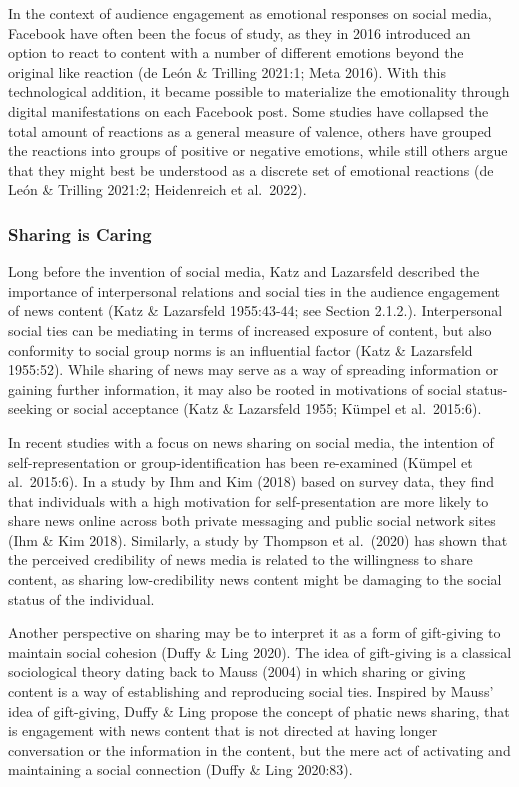 \documentclass[
]{article}
\begin{document}
In the context of audience engagement as emotional responses on social
media, Facebook have often been the focus of study, as they in 2016
introduced an option to react to content with a number of different
emotions beyond the original like reaction (de León \& Trilling 2021:1;
Meta 2016). With this technological addition, it became possible to
materialize the emotionality through digital manifestations on each
Facebook post. Some studies have collapsed the total amount of reactions
as a general measure of valence, others have grouped the reactions into
groups of positive or negative emotions, while still others argue that
they might best be understood as a discrete set of emotional reactions
(de León \& Trilling 2021:2; Heidenreich et al.~2022).

\hypertarget{sharing-is-caring}{%
\subsubsection{Sharing is Caring}\label{sharing-is-caring}}

\noindent Long before the invention of social media, Katz and Lazarsfeld
described the importance of interpersonal relations and social ties in
the audience engagement of news content (Katz \& Lazarsfeld 1955:43-44;
see Section 2.1.2.). Interpersonal social ties can be mediating in terms
of increased exposure of content, but also conformity to social group
norms is an influential factor (Katz \& Lazarsfeld 1955:52). While
sharing of news may serve as a way of spreading information or gaining
further information, it may also be rooted in motivations of social
status-seeking or social acceptance (Katz \& Lazarsfeld 1955; Kümpel et
al.~2015:6).

In recent studies with a focus on news sharing on social media, the
intention of self-representation or group-identification has been
re-examined (Kümpel et al.~2015:6). In a study by Ihm and Kim (2018)
based on survey data, they find that individuals with a high motivation
for self-presentation are more likely to share news online across both
private messaging and public social network sites (Ihm \& Kim 2018).
Similarly, a study by Thompson et al.~(2020) has shown that the
perceived credibility of news media is related to the willingness to
share content, as sharing low-credibility news content might be damaging
to the social status of the individual.

Another perspective on sharing may be to interpret it as a form of
gift-giving to maintain social cohesion (Duffy \& Ling 2020). The idea
of gift-giving is a classical sociological theory dating back to Mauss
(2004) in which sharing or giving content is a way of establishing and
reproducing social ties. Inspired by Mauss' idea of gift-giving, Duffy
\& Ling propose the concept of phatic news sharing, that is engagement
with news content that is not directed at having longer conversation or
the information in the content, but the mere act of activating and
maintaining a social connection (Duffy \& Ling 2020:83).
\end{document}
